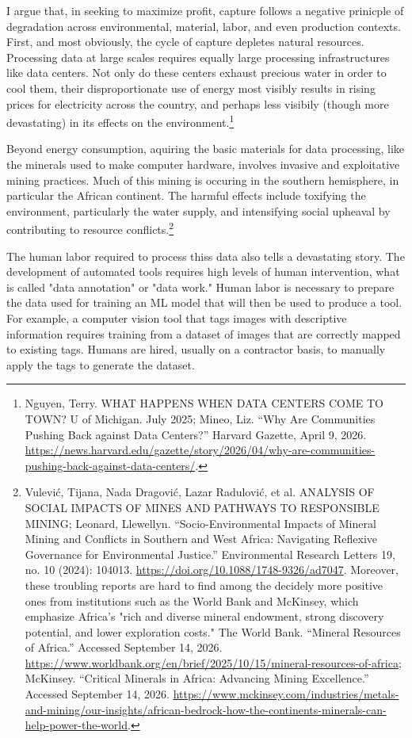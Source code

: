 \documentclass[11pt]{article}
\begin{document}
\begin{enumerate}
I argue that, in seeking to maximize profit, capture follows a
negative prinicple of degradation across environmental, material,
labor, and even production contexts. First, and most obviously, the
cycle of capture depletes natural resources. Processing data at large
scales requires equally large processing infrastructures like data
centers. Not only do these centers exhaust precious water in order to
cool them, their disproportionate use of energy most visibly results
in rising prices for electricity across the country, and perhaps less
visibily (though more devastating) in its effects on the
environment.\footnote{Nguyen, Terry. WHAT HAPPENS WHEN DATA CENTERS COME TO TOWN? U
of Michigan. July 2025; Mineo, Liz. “Why Are Communities Pushing Back
against Data Centers?” Harvard Gazette, April 9, 2026.
\url{https://news.harvard.edu/gazette/story/2026/04/why-are-communities-pushing-back-against-data-centers/}.}

Beyond energy consumption, aquiring the basic materials for data
processing, like the minerals used to make computer hardware, involves
invasive and exploitative mining practices. Much of this mining is
occuring in the southern hemisphere, in particular the African
continent. The harmful effects include toxifying the environment,
particularly the water supply, and intensifying social upheaval by
contributing to resource conflicts.\footnote{Vulević, Tijana, Nada Dragović, Lazar Radulović, et al.
ANALYSIS OF SOCIAL IMPACTS OF MINES AND PATHWAYS TO RESPONSIBLE
MINING; Leonard, Llewellyn. “Socio-Environmental Impacts of Mineral
Mining and Conflicts in Southern and West Africa: Navigating Reflexive
Governance for Environmental Justice.” Environmental Research Letters
19, no. 10 (2024): 104013. \url{https://doi.org/10.1088/1748-9326/ad7047}.
Moreover, these troubling reports are hard to find among the decidely
more positive ones from institutions such as the World Bank and
McKinsey, which emphasize Africa's "rich and diverse mineral
endowment, strong discovery potential, and lower exploration costs."
The World Bank. “Mineral Resources of Africa.” Accessed September
14, 2026.
\url{https://www.worldbank.org/en/brief/2025/10/15/mineral-resources-of-africa};
McKinsey. “Critical Minerals in Africa: Advancing Mining Excellence.”
Accessed September 14, 2026.
\url{https://www.mckinsey.com/industries/metals-and-mining/our-insights/african-bedrock-how-the-continents-minerals-can-help-power-the-world}.}

The human labor required to process thiss data also tells a devastating
story. The development of automated tools requires high levels of
human intervention, what is called "data annotation" or "data work."
Human labor is necessary to prepare the data used for training an ML
model that will then be used to produce a tool. For example, a
computer vision tool that tags images with descriptive information
requires training from a dataset of images that are correctly mapped
to existing tags. Humans are hired, usually on a contractor basis, to
manually apply the tags to generate the dataset.


\end{enumerate}
\end{document}
